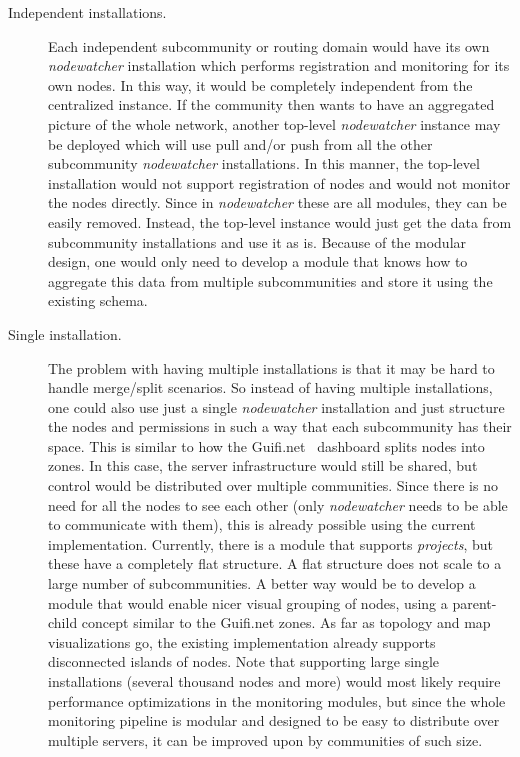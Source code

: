 \documentclass[5p,sort&compress]{elsarticle}
\newcommand{\nodewatcher}{\textit{nodewatcher}}
\begin{document}
\begin{description}
    \item[Independent installations.] Each independent subcommunity or routing domain would have its own \nodewatcher{} installation which performs registration and monitoring for its own nodes.
    In this way, it would be completely independent from the centralized instance.
    If the community then wants to have an aggregated picture of the whole network, another top-level \nodewatcher{} instance may be deployed which will use pull and/or push from all the other subcommunity \nodewatcher{} installations.
    In this manner, the top-level installation would not support registration of nodes and would not monitor the nodes directly.
    Since in \nodewatcher{} these are all modules, they can be easily removed.
    Instead, the top-level instance would just get the data from subcommunity installations and use it as is.
    Because of the modular design, one would only need to develop a module that knows how to aggregate this data from multiple subcommunities and store it using the existing schema.

    \item[Single installation.] The problem with having multiple installations is that it may be hard to handle merge/split scenarios.
    So instead of having multiple installations, one could also use just a single \nodewatcher{} installation and just structure the nodes and permissions in such a way that each subcommunity has their space.
    This is similar to how the Guifi.net~\cite{Guifinode_2003,Vega_2012} dashboard splits nodes into zones.
    In this case, the server infrastructure would still be shared, but control would be distributed over multiple communities.
    Since there is no need for all the nodes to see each other (only \nodewatcher{} needs to be able to communicate with them), this is already possible using the current implementation.
    Currently, there is a module that supports \textit{projects}, but these have a completely flat structure.
    A flat structure does not scale to a large number of subcommunities.
    A better way would be to develop a module that would enable nicer visual grouping of nodes, using a parent-child concept similar to the Guifi.net zones.
    As far as topology and map visualizations go, the existing implementation already supports disconnected islands of nodes.
    Note that supporting large single installations (several thousand nodes and more) would most likely require performance optimizations in the monitoring modules, but since the whole monitoring pipeline is modular and designed to be easy to distribute over multiple servers, it can be improved upon by communities of such size.
\end{description}
\end{document}
